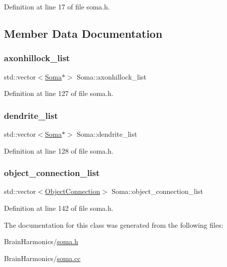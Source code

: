 Definition at line 17 of file soma.\+h.



\subsection{Member Data Documentation}
\mbox{\label{class_soma_af93902336cddb974b282aef8b7b4243c}} 
\subsubsection{\texorpdfstring{axonhillock\+\_\+list}{axonhillock\_list}}
{\footnotesize\ttfamily std\+::vector$<$\hyperlink{class_soma}{Soma}$\ast$$>$ Soma\+::axonhillock\+\_\+list\hspace{0.3cm}{\ttfamily [protected]}}



Definition at line 127 of file soma.\+h.

\mbox{\label{class_soma_ab2d13b0adf2d10c242df0b8e62bcc01a}} 
\subsubsection{\texorpdfstring{dendrite\+\_\+list}{dendrite\_list}}
{\footnotesize\ttfamily std\+::vector$<$\hyperlink{class_soma}{Soma}$\ast$$>$ Soma\+::dendrite\+\_\+list\hspace{0.3cm}{\ttfamily [protected]}}



Definition at line 128 of file soma.\+h.

\mbox{\label{class_soma_a84739acd533862b115bd5cbe56da6c98}} 
\subsubsection{\texorpdfstring{object\+\_\+connection\+\_\+list}{object\_connection\_list}}
{\footnotesize\ttfamily std\+::vector$<$\hyperlink{struct_soma_1_1_object_connection}{Object\+Connection}$>$ Soma\+::object\+\_\+connection\+\_\+list\hspace{0.3cm}{\ttfamily [protected]}}



Definition at line 142 of file soma.\+h.



The documentation for this class was generated from the following files\+:\begin{DoxyCompactItemize}
\item 
Brain\+Harmonics/\hyperlink{soma_8h}{soma.\+h}\item 
Brain\+Harmonics/\hyperlink{soma_8cc}{soma.\+cc}\end{DoxyCompactItemize}
